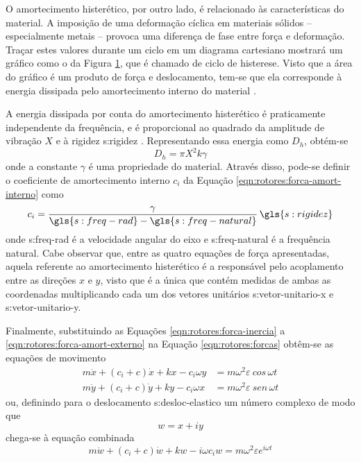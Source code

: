 \documentclass[12pt,openright,oneside,a4paper,
	chapter=TITLE,section=TITLE,
	english,brazil]{abntex2}
\begin{document}
	O amortecimento histerético, por outro lado, é relacionado às características do material. A imposição de uma deformação cíclica em materiais sólidos -- especialmente metais -- provoca uma diferença de fase entre força e deformação. Traçar estes valores durante um ciclo em um diagrama cartesiano mostrará um gráfico como o da Figura \ref{fig:histerese}, que é chamado de ciclo de histerese. Visto que a área do gráfico é um produto de força e deslocamento, tem-se que ela corresponde à energia dissipada pelo amortecimento interno do material \cite{dimarogonas:1995}. 
	\begin{figure}[b]
		\label{fig:histerese}
	\end{figure}

	A energia dissipada por conta do amortecimento histerético é praticamente independente da frequência, e é proporcional ao quadrado da amplitude de vibração $ X $ e à rigidez \gls{s:rigidez} \cite{dimarogonas:1995}. Representando essa energia como $ D_h $, obtém-se
	\begin{equation}
		D_h = \pi X^2k\gamma
	\end{equation}
	onde a constante $ \gamma $ é uma propriedade do material. Através disso, pode-se definir o coeficiente de amortecimento interno $ c_i $ da Equação \ref{eqn:rotores:forca-amort-interno} como \cite{dimarogonas:1995}
	\begin{equation}
		c_i = \frac{\gamma}{\gls{s:freq-rad} - \gls{s:freq-natural}}\,\gls{s:rigidez}
	\end{equation}
	onde \gls{s:freq-rad} é a velocidade angular do eixo e \gls{s:freq-natural} é a frequência natural. Cabe observar que, entre as quatro equações de força apresentadas, aquela referente ao amortecimento histerético é a responsável pelo acoplamento entre as direções $ x $ e $ y $, visto que é a única que contém medidas de ambas as coordenadas multiplicando cada um dos vetores unitários \gls{s:vetor-unitario-x} e \gls{s:vetor-unitario-y}.
	
	Finalmente, substituindo as Equações \ref{eqn:rotores:forca-inercia} a \ref{eqn:rotores:forca-amort-externo} na Equação \ref{eqn:rotores:forcas} obtêm-se as equações de movimento \cite{rao:2008}
	\begin{align}
		m\ddot{x} + (c_i + c)\dot{x} + kx - c_i\omega y &= m\omega^2\varepsilon\ cos\,\omega t \\
		m\ddot{y} + (c_i + c)\dot{y} + ky - c_i\omega x &= m\omega^2\varepsilon\ sen\,\omega t
	\end{align}
	ou, definindo para o deslocamento \gls{s:desloc-elastico} um número complexo de modo que \[ w = x + iy \] chega-se à equação combinada
	\begin{equation}\label{eqn:rotores:resposta-rodopio}
		m\ddot{w} + (c_i + c)\dot{w} + kw - i\omega c_i w = m\omega^2 \varepsilon e^{i\omega t}
	\end{equation}
	
\end{document}
